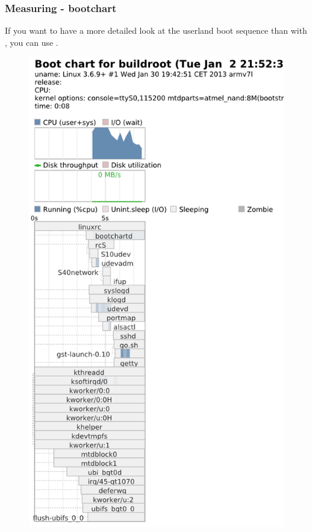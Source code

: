 \begin{frame}
\frametitle{Measuring - bootchart}
If you want to have a more detailed look at the userland boot sequence
than with , you can use .
\begin{figure}[h!]
	\centering
	\includegraphics[height=0.8\textheight]{slides/boottime-init-scripts/bootchart.png}
\end{figure}
\end{frame}

